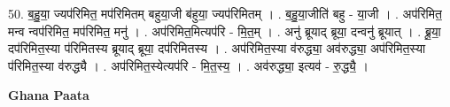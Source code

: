 \documentclass[17pt]{extarticle}
\begin{document}
50. ब॒हु॒या॒ ज्यप॑रिमित॒ मप॑रिमितम् बहुया॒जी ब॑हुया॒ ज्यप॑रिमितम् । . ब॒हु॒या॒जीति॑ बहु - या॒जी । . अप॑रिमित॒ मन्व न्वप॑रिमित॒ मप॑रिमित॒ मनु॑ । . अप॑रिमित॒मित्यप॑रि - मि॒त॒म् । . अनु॑ ब्रूयाद् ब्रूया॒ दन्वनु॑ ब्रूयात् । . ब्रू॒या॒ दप॑रिमित॒स्या प॑रिमितस्य ब्रूयाद् ब्रूया॒ दप॑रिमितस्य । . अप॑रिमित॒स्या व॑रुद्ध्या॒ अव॑रुद्ध्या॒ अप॑रिमित॒स्या प॑रिमित॒स्या व॑रुद्ध्यै । . अप॑रिमित॒स्येत्यप॑रि - मि॒त॒स्य॒ । . अव॑रुद्ध्या॒ इत्यव॑ - रु॒द्ध्यै॒ । \newline

\textbf{Ghana Paata } \newline
\end{document}
